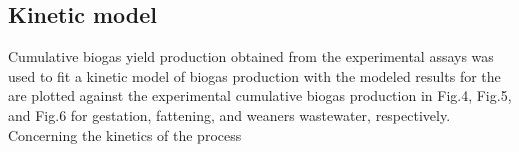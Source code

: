 \subsection{Kinetic model}
Cumulative biogas yield production obtained from the experimental assays was used to fit a kinetic model of biogas production with the modeled results for the  are plotted against the experimental cumulative biogas production in Fig.4, Fig.5, and Fig.6 for gestation, fattening, and weaners wastewater, respectively.
Concerning the kinetics of the process